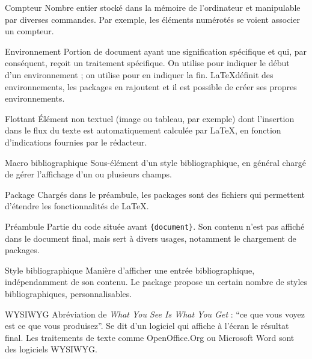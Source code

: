 \begin{glossaire}
\item[Compteur] Nombre entier stocké dans la mémoire de l'ordinateur et manipulable par diverses commandes. Par exemple, les éléments numérotés se voient associer un compteur.


\item[Environnement] Portion de document ayant une signification spécifique et qui, par conséquent, reçoit un traitement spécifique. On utilise  pour indiquer le début d'un environnement ; on utilise  pour en indiquer la fin. \LaTeX définit des environnements, les packages en rajoutent et il est possible de créer ses propres environnements.

\item[Flottant] Élément non textuel (image ou tableau, par exemple) dont l'insertion dans le flux du texte est automatiquement calculée par \LaTeX, en fonction d'indications fournies par le rédacteur.

\item[Macro bibliographique] Sous-élément d'un style bibliographique, en général chargé de gérer l'affichage d'un ou plusieurs champs.

\item[Package] Chargés dans le préambule, les packages sont des fichiers qui permettent d'étendre les fonctionnalités  de \LaTeX.

\item[Préambule] Partie du code  située avant \verb|{document}|. Son contenu n'est pas affiché dans le document final, mais sert à divers usages, notamment le chargement de packages.

\item[Style bibliographique] Manière d'afficher une entrée bibliographique, indépendamment de son contenu. Le package  propose un certain nombre de styles bibliographiques, personnalisables. 

\item[WYSIWYG] Abréviation de \textenglish{\emph{What You See Is What You Get}} : \enquote{ce que vous voyez est ce que vous produisez}. Se dit d'un logiciel qui affiche à l'écran le résultat final. Les traitements de texte comme OpenOffice.Org ou Microsoft Word sont des logiciels WYSIWYG.
\end{glossaire}

